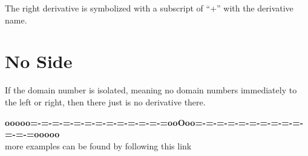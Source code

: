 \documentclass{ximera}
\begin{document}
The right derivative is symbolized with a subscript of ``+'' with the derivative name. \\







\section*{No Side}


If the domain number is isolated, meaning no domain numbers immediately to the left or right, then there just is no derivative there.




















\begin{center}
\textbf{\textcolor{green!50!black}{ooooo=-=-=-=-=-=-=-=-=-=-=-=-=ooOoo=-=-=-=-=-=-=-=-=-=-=-=-=ooooo}} \\

more examples can be found by following this link\\ 

\end{center}
\end{document}
